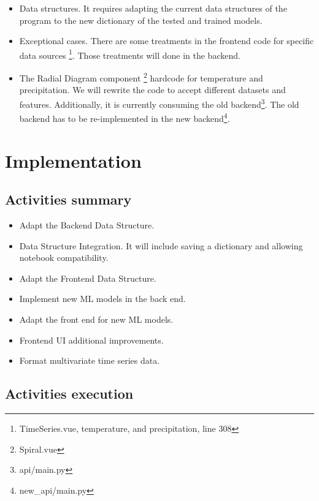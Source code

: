 \documentclass[a4paper]{article}
\begin{document}
\begin{itemize}
\item Data structures. It requires adapting the current data structures of the program to the new dictionary of the tested and trained models.

\item Exceptional cases. There are some treatments in the frontend code for specific data sources \footnote{TimeSeries.vue, temperature, and precipitation, line 308}. Those treatments will done in the backend.

\item The Radial Diagram component \footnote{Spiral.vue} hardcode for temperature and precipitation. We will rewrite the code to accept different datasets and features. Additionally, it is currently consuming the old backend\footnote{api/main.py}. The old backend has to be re-implemented in the new backend\footnote{new\_api/main.py}.
\end{itemize}

\section{Implementation}
\label{sec:org0b354f1}

\subsection{Activities summary}
\label{sec:org76f7092}

\begin{itemize}
\item Adapt the Backend Data Structure.

\item Data Structure Integration. It will include saving a dictionary and allowing notebook compatibility.

\item Adapt the Frontend Data Structure.

\item Implement new ML models in the back end.

\item Adapt the front end for new ML models.

\item Frontend UI additional improvements.

\item Format multivariate time series data.
\end{itemize}


\subsection{Activities execution}
\label{sec:org769784a}
\end{document}
